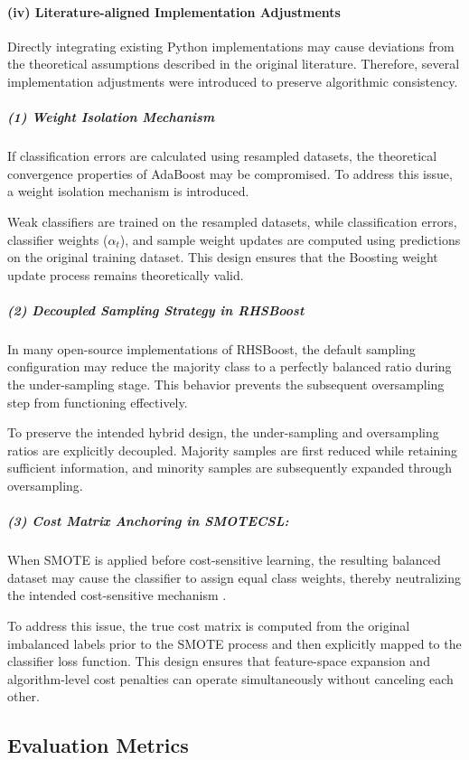 \documentclass[sigconf]{acmart}
\begin{document}
\paragraph{(iv) Literature-aligned Implementation Adjustments}
Directly integrating existing Python implementations may cause deviations from the theoretical assumptions described in the original literature. Therefore, several implementation adjustments were introduced to preserve algorithmic consistency. 

\subparagraph{(1) Weight Isolation Mechanism}
If classification errors are calculated using resampled datasets, the theoretical convergence properties of AdaBoost may be compromised. To address this issue, a weight isolation mechanism is introduced. 

Weak classifiers are trained on the resampled datasets, while classification errors, classifier weights ($\alpha_t$), and sample weight updates are computed using predictions on the original training dataset. This design ensures that the Boosting weight update process remains theoretically valid. 

\subparagraph{(2) Decoupled Sampling Strategy in RHSBoost}

In many open-source implementations of RHSBoost, the default sampling configuration may reduce the majority class to a perfectly balanced ratio during the under-sampling stage. This behavior prevents the subsequent oversampling step from functioning effectively. 

To preserve the intended hybrid design, the under-sampling and oversampling ratios are explicitly decoupled. Majority samples are first reduced while retaining sufficient information, and minority samples are subsequently expanded through oversampling. 

\subparagraph{(3) Cost Matrix Anchoring in SMOTECSL:}  

When SMOTE is applied before cost-sensitive learning, the resulting balanced dataset may cause the classifier to assign equal class weights, thereby neutralizing the intended cost-sensitive mechanism \cite{29}. 

To address this issue, the true cost matrix is computed from the original imbalanced labels prior to the SMOTE process and then explicitly mapped to the classifier loss function. This design ensures that feature-space expansion and algorithm-level cost penalties can operate simultaneously without canceling each other. 
\subsection{Evaluation Metrics}
\end{document}
